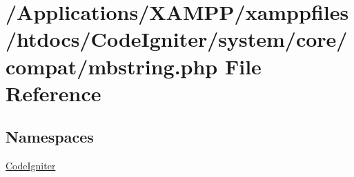\hypertarget{mbstring_8php}{}\section{/\+Applications/\+X\+A\+M\+P\+P/xamppfiles/htdocs/\+Code\+Igniter/system/core/compat/mbstring.php File Reference}
\label{mbstring_8php}
\subsection*{Namespaces}
\begin{DoxyCompactItemize}
\item 
 \mbox{\hyperlink{namespace_code_igniter}{Code\+Igniter}}
\end{DoxyCompactItemize}

